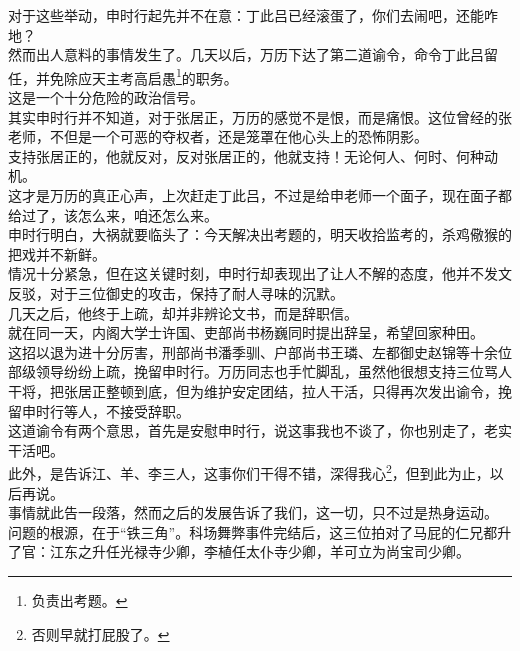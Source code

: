 \begin{multicols}{\theparacolNo}
对于这些举动，申时行起先并不在意：丁此吕已经滚蛋了，你们去闹吧，还能咋地？\\

然而出人意料的事情发生了。几天以后，万历下达了第二道谕令，命令丁此吕留任，并免除应天主考高启愚\footnote{负责出考题。}的职务。\\

这是一个十分危险的政治信号。\\

其实申时行并不知道，对于张居正，万历的感觉不是恨，而是痛恨。这位曾经的张老师，不但是一个可恶的夺权者，还是笼罩在他心头上的恐怖阴影。\\

支持张居正的，他就反对，反对张居正的，他就支持！无论何人、何时、何种动机。\\

这才是万历的真正心声，上次赶走丁此吕，不过是给申老师一个面子，现在面子都给过了，该怎么来，咱还怎么来。\\

申时行明白，大祸就要临头了：今天解决出考题的，明天收拾监考的，杀鸡儆猴的把戏并不新鲜。\\

情况十分紧急，但在这关键时刻，申时行却表现出了让人不解的态度，他并不发文反驳，对于三位御史的攻击，保持了耐人寻味的沉默。\\

几天之后，他终于上疏，却并非辨论文书，而是辞职信。\\

就在同一天，内阁大学士许国、吏部尚书杨巍同时提出辞呈，希望回家种田。\\

这招以退为进十分厉害，刑部尚书潘季驯、户部尚书王璘、左都御史赵锦等十余位部级领导纷纷上疏，挽留申时行。万历同志也手忙脚乱，虽然他很想支持三位骂人干将，把张居正整顿到底，但为维护安定团结，拉人干活，只得再次发出谕令，挽留申时行等人，不接受辞职。\\

这道谕令有两个意思，首先是安慰申时行，说这事我也不谈了，你也别走了，老实干活吧。\\

此外，是告诉江、羊、李三人，这事你们干得不错，深得我心\footnote{否则早就打屁股了。}，但到此为止，以后再说。\\

事情就此告一段落，然而之后的发展告诉了我们，这一切，只不过是热身运动。\\

问题的根源，在于“铁三角”。科场舞弊事件完结后，这三位拍对了马屁的仁兄都升了官：江东之升任光禄寺少卿，李植任太仆寺少卿，羊可立为尚宝司少卿。\\


\end{multicols}
